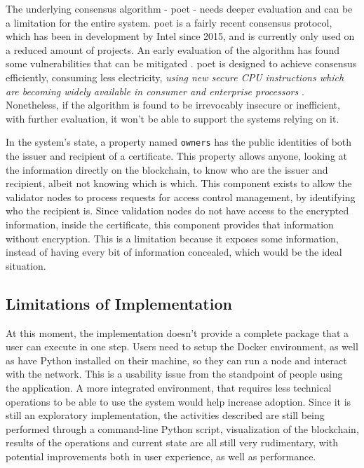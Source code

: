 The underlying consensus algorithm - \gls{poet} - needs deeper evaluation and can be a limitation for the entire system. \gls{poet} is a fairly recent consensus protocol, which has been in development by Intel since 2015, and is currently only used on a reduced amount of projects. An early evaluation of the algorithm has found some vulnerabilities that can be mitigated \cite{chen_security_2017}. \gls{poet} is designed to achieve consensus efficiently, consuming less electricity, \emph{using new secure CPU instructions which are becoming widely available in consumer and enterprise processors} \cite{intel_poet}. Nonetheless, if the algorithm is found to be irrevocably insecure or inefficient, with further evaluation, it won't be able to support the systems relying on it.

In the system's state, a property named \texttt{owners} has the public identities of both the issuer and recipient of a certificate. This property allows anyone, looking at the information directly on the blockchain, to know who are the issuer and recipient, albeit not knowing which is which. This component exists to allow the validator nodes to process requests for access control management, by identifying who the recipient is. Since validation nodes do not have access to the encrypted information, inside the certificate, this component provides that information without encryption. This is a limitation because it exposes some information, instead of having every bit of information concealed, which would be the ideal situation.

\subsection{Limitations of Implementation}

At this moment, the implementation doesn't provide a complete package that a user can execute in one step. Users need to setup the Docker environment, as well as have Python installed on their machine, so they can run a node and interact with the network. This is a usability issue from the standpoint of people using the application. A more integrated environment, that requires less technical operations to be able to use the system would help increase adoption. Since it is still an exploratory implementation, the activities described are still being performed through a command-line Python script, visualization of the blockchain, results of the operations and current state are all still very rudimentary, with potential improvements both in user experience, as well as performance.